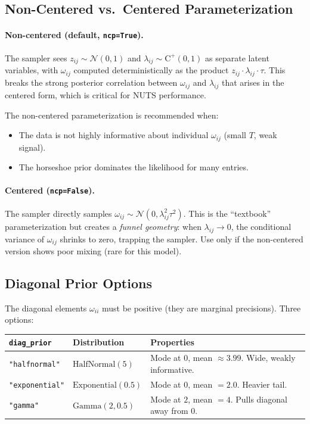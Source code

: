 \documentclass[11pt,a4paper]{article}
\newcommand{\Normal}{\mathcal{N}}
\newcommand{\HalfCauchy}{\mathrm{C}^{+}}
\begin{document}
\subsection{Non-Centered vs.\ Centered Parameterization}

\paragraph{Non-centered (default, \texttt{ncp=True}).} The sampler sees $z_{ij} \sim \Normal(0,1)$ and $\lambda_{ij} \sim \HalfCauchy(0,1)$ as separate latent variables, with $\omega_{ij}$ computed deterministically as the product $z_{ij} \cdot \lambda_{ij} \cdot \tau$. This breaks the strong posterior correlation between $\omega_{ij}$ and $\lambda_{ij}$ that arises in the centered form, which is critical for NUTS performance.

The non-centered parameterization is recommended when:
\begin{itemize}[nosep]
  \item The data is not highly informative about individual $\omega_{ij}$ (small $T$, weak signal).
  \item The horseshoe prior dominates the likelihood for many entries.
\end{itemize}

\paragraph{Centered (\texttt{ncp=False}).} The sampler directly samples $\omega_{ij} \sim \Normal(0, \lambda_{ij}^2 \tau^2)$. This is the ``textbook'' parameterization but creates a \emph{funnel geometry}: when $\lambda_{ij} \to 0$, the conditional variance of $\omega_{ij}$ shrinks to zero, trapping the sampler.  Use only if the non-centered version shows poor mixing (rare for this model).

\subsection{Diagonal Prior Options}

The diagonal elements $\omega_{ii}$ must be positive (they are marginal precisions). Three options:

\begin{center}
\begin{tabular}{@{}lll@{}}
\toprule
\texttt{diag\_prior} & Distribution & Properties \\
\midrule
\texttt{"halfnormal"} & $\text{HalfNormal}(5)$ & Mode at 0, mean $\approx 3.99$. Wide, weakly informative. \\
\texttt{"exponential"} & $\text{Exponential}(0.5)$ & Mode at 0, mean $= 2.0$. Heavier tail. \\
\texttt{"gamma"} & $\text{Gamma}(2, 0.5)$ & Mode at $2$, mean $= 4$. Pulls diagonal away from 0. \\
\bottomrule
\end{tabular}
\end{center}
\end{document}
